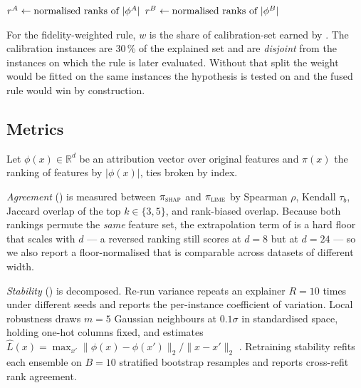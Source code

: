 \begin{algorithm}[t]
\caption{Rank-level fusion of two explanations}\label{alg:fusion}
$r^{A} \gets \textnormal{normalised ranks of } |\phi^{A}|$\;
$r^{B} \gets \textnormal{normalised ranks of } |\phi^{B}|$\;
\;
\end{algorithm}

For the fidelity-weighted rule, $w$ is the share of calibration-set \aopc{} earned by
\shap{}. The calibration instances are 30\,\% of the explained set and are
\emph{disjoint} from the instances on which the rule is later evaluated. Without that
split the weight would be fitted on the same instances the hypothesis is tested on and
the fused rule would win by construction.

\subsection{Metrics}\label{sec:method-metrics}
Let $\phi(x) \in \mathbb{R}^{d}$ be an attribution vector over original features and
$\pi(x)$ the ranking of features by $|\phi(x)|$, ties broken by index.

\emph{Agreement} () is measured between $\pi_{\textsc{shap}}$ and $\pi_{\textsc{lime}}$ by
Spearman $\rho$, Kendall $\tau_b$, Jaccard overlap of the top $k \in \{3,5\}$, and
rank-biased overlap. Because both rankings permute the \emph{same} feature set, the
extrapolation term of \rbo{} is a hard floor that scales with $d$ --- a reversed
ranking still scores \RboFloorEight{} at $d=8$ but \RboFloorTwentyFour{} at $d=24$ --- so we also report a
floor-normalised \rbo{} that is comparable across datasets of different width.

\emph{Stability} () is decomposed. Re-run variance repeats an explainer $R=10$
times under different seeds and reports the per-instance coefficient of variation.
Local robustness draws $m=5$ Gaussian neighbours at $0.1\sigma$ in standardised space,
holding one-hot columns fixed, and estimates
$\hat{L}(x)=\max_{x'} \lVert \phi(x)-\phi(x')\rVert_2 / \lVert x-x'\rVert_2$
\cite{alvarezmelis2018robustness}. Retraining stability refits each ensemble on $B=10$
stratified bootstrap resamples and reports cross-refit rank agreement.

